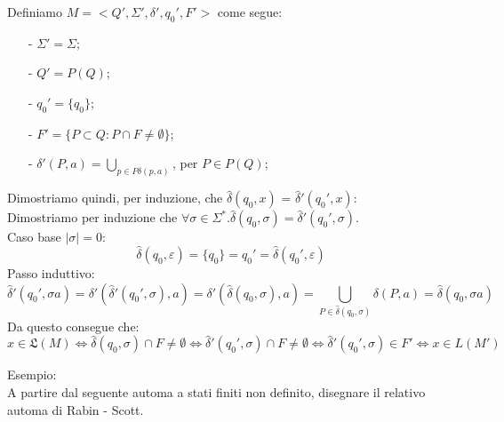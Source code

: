 \documentclass[a4paper, 10pt]{report}
\begin{document}
\begin{tcolorbox}[title=\textbf{Dimostrazione}]
Definiamo $M = <Q', \Sigma', \delta', q_0', F'>$ come segue:
\begin{itemize}
\item[-] $\Sigma' = \Sigma$;
\item[-] $Q' = P(Q)$;
\item[-] $q_0' = \{q_0 \}$;
\item[-] $F' = \{ P \subset Q : P \cap F \ne \emptyset\}$;
\item[-] $\delta'(P, a) = \bigcup_{p \in P \delta(p, a)}$, per $P \in P(Q)$;
\end{itemize}

Dimostriamo quindi, per induzione, che $\hat{\delta}(q_0, x)$ = $\hat{\delta}'(q_0', x)$:\\

Dimostriamo per induzione che $\forall \sigma \in \Sigma^{*}.\hat{\delta}(q_0, \sigma) = \hat{\delta}'(q_0', \sigma)$. \\ Caso base $|\sigma| = 0$:
	\[
		\hat{\delta}(q_0, \varepsilon) = \{q_0\} = q_0' = \hat{\delta}(q_0', \varepsilon)
	\]
	Passo induttivo: 
	\[
		\hat\delta'(q_0', \sigma a) = 
		\delta'(\hat\delta'(q_0', \sigma), a) = 
		\delta'(\hat\delta(q_0, \sigma), a) = 
		\bigcup_{P \in \hat\delta(q_0, \sigma)} \delta(P, a) = \hat{\delta}(q_0, \sigma a)
	\]
	Da questo consegue che:
	\[
		x \in \mathfrak{L}(M) \iff \hat\delta(q_0, \sigma) \cap F \neq \emptyset \iff \hat\delta'(q_0', \sigma) \cap F \neq \emptyset 
				\iff \hat\delta'(q_0', \sigma) \in F' \iff x \in L(M') 
	\]
	
\end{tcolorbox}

\noindent Esempio:\\

A partire dal seguente automa a stati finiti non definito, disegnare il relativo automa di Rabin - Scott.
\end{document}
